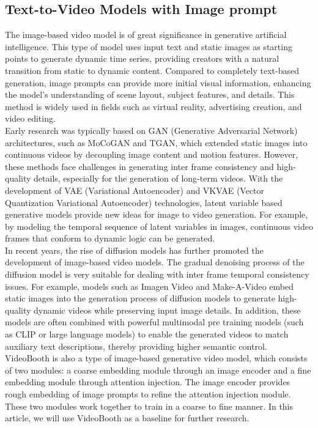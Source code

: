 \subsection{Text-to-Video Models with Image prompt}
The image-based video model is of great significance in generative artificial intelligence. This type of model uses input text and static images as starting points to generate dynamic time series, providing creators with a natural transition from static to dynamic content. Compared to completely text-based generation, image prompts can provide more initial visual information, enhancing the model's understanding of scene layout, subject features, and details. This method is widely used in fields such as virtual reality, advertising creation, and video editing.\\
\indent Early research was typically based on GAN (Generative Adversarial Network) architectures, such as MoCoGAN \cite{tulyakov2018mocogan} and TGAN, which extended static images into continuous videos by decoupling image content and motion features. However, these methods face challenges in generating inter frame consistency and high-quality details, especially for the generation of long-term videos. With the development of VAE (Variational Autoencoder) and VKVAE (Vector Quantization Variational Autoencoder) technologies, latent variable based generative models provide new ideas for image to video generation. For example, by modeling the temporal sequence of latent variables in images, continuous video frames that conform to dynamic logic can be generated.\\
\indent In recent years, the rise of diffusion models has further promoted the development of image-based video models. The gradual denoising process of the diffusion model is very suitable for dealing with inter frame temporal consistency issues. For example, models such as Imagen Video \cite{ho2022imagen} and Make-A-Video \cite{singer2022make} embed static images into the generation process of diffusion models to generate high-quality dynamic videos while preserving input image details. In addition, these models are often combined with powerful multimodal pre training models (such as CLIP or large language models) to enable the generated videos to match auxiliary text descriptions, thereby providing higher semantic control.\\
\indent VideoBooth \cite{jiang2024videobooth} is also a type of image-based generative video model, which consists of two modules: a coarse embedding module through an image encoder and a fine embedding module through attention injection. The image encoder provides rough embedding of image prompts to refine the attention injection module. These two modules work together to train in a coarse to fine manner. In this article, we will use VideoBooth as a baseline for further research.